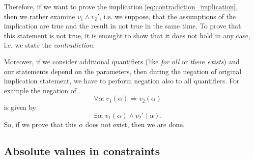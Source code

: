 Therefore, if we want to prove the implication \eqref{eq:contradiction_implication}, then we rather examine $v_1 \wedge v_2'$, i.e. we suppose, that the assumptions of the implication are true and the result in not true in the same time.
To prove that this statement is not true, it is enought to show that it does not hold in any case, i.e. we state the \emph{contradiction}.

Moreover, if we consider additional quantifiers (like \emph{for all} or \emph{there exists}) and our statements depend on the parameters, 
then during the negation of original implication statement, we have to perform negation also to all quantifiers.
For example the negation of
\begin{displaymath}
 \forall \alpha: v_1(\alpha) \Rightarrow v_2(\alpha)
\end{displaymath}
is given by
\begin{displaymath}
 \exists \alpha: v_1(\alpha) \wedge v_2'(\alpha).
\end{displaymath}
So, if we prove that this $\alpha$ does not exist, then we are done.



\subsection{Absolute values in constraints}

